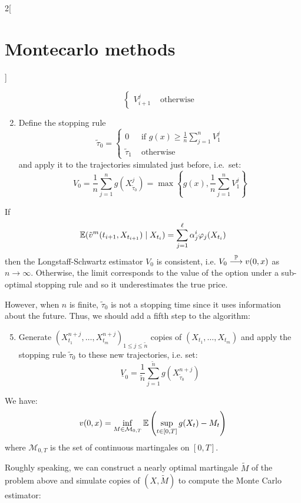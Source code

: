 \documentclass[../../../main_math.tex]{subfiles}
\begin{document}
\begin{multicols}{2}[\section{Montecarlo methods}]
\begin{proposition}
\begin{enumerate}
$$\begin{cases}
                V_{i+1}^j    & \text{ otherwise}
              \end{cases}
            $$
      \item Define the stopping rule
            $$
              \tilde{\tau}_0=\begin{cases}
                0              & \text{ if } g(x)\geq \frac{1}{n}\sum_{j=1}^n V_1^j \\
                \tilde{\tau}_1 & \text{ otherwise}
              \end{cases}
            $$
            and apply it to the trajectories simulated just before, i.e.\ set:
            $$
              V_0=\frac{1}{n} \sum_{j=1}^ng(X_{\tilde{\tau}_0}^j)=\max\left\{ g(x),\frac{1}{n}\sum_{j=1}^n V_1^j\right\}
            $$
    \end{enumerate}
  \end{proposition}
  \begin{theorem}
    If $$
      \mathbb{E}(\tilde{v}^m(t_{i+1},X_{t_{i+1}})\mid X_{t_i})=\sum_{j=1}^\ell \alpha_j^i\varphi_j(X_{t_i})
    $$
    then the Longstaff-Schwartz estimator $V_0$ is consistent, i.e. $V_0\overset{\mathbb{P}}{\longrightarrow}v(0,x)$ as $n\to\infty$. Otherwise, the limit corresponds to the value of the option under a sub-optimal stopping rule and so it underestimates the
    true price.
  \end{theorem}
  \begin{remark}
    However, when $n$ is finite, $\tilde{\tau}_0$ is not a stopping time since it uses information about the future. Thus, we should add a fifth step to the algorithm:
    \begin{enumerate}
      \setcounter{enumi}{4}
      \item Generate ${(X_{t_1}^{n+j},\ldots,X_{t_m}^{n+j})}_{1\leq j\leq \tilde{n}}$ \iid copies of $(X_{t_1},\ldots,X_{t_m})$ and apply the stopping rule $\tilde{\tau}_0$ to these new trajectories, i.e. set:
            $$
              \underline{V}_0=\frac{1}{\tilde{n}} \sum_{j=1}^{\tilde{n}}g(X_{\tilde{\tau}_0}^{n+j})
            $$
    \end{enumerate}
  \end{remark}
  \begin{lemma}
    We have:
    $$
      v(0,x)=\inf_{M\in\mathcal{M}_{0,T}}\mathbb{E}\left(\sup_{t\in[0,T]}g(X_t)-M_t\right)
    $$
    where $\mathcal{M}_{0,T}$ is the set of continuous martingales on $[0,T]$.
  \end{lemma}
  \begin{remark}
    Roughly speaking, we can construct a nearly optimal martingale $\tilde{M}$ of the problem above and simulate \iid copies of $(X,\tilde{M})$ to compute the Monte Carlo estimator:

\end{remark}
\end{multicols}
\end{document}
